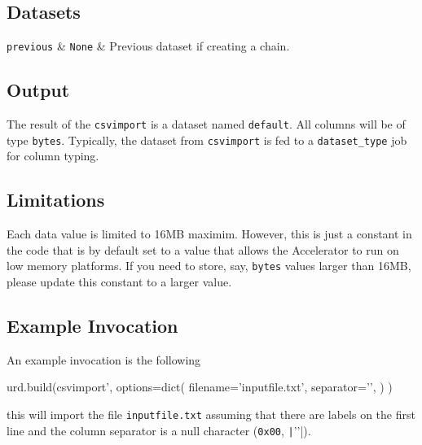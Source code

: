 \subsection{Datasets}

\starttable
  \RP \texttt{previous} & \texttt{None} & Previous dataset if creating a
  chain.\\
\stoptable



\subsection{Output}
The result of the \texttt{csvimport} is a dataset named
\texttt{default}.  All columns will be of type
\texttt{bytes}.  Typically, the dataset from
\texttt{csvimport} is fed to a \texttt{dataset\_type} job for column
typing.


\subsection{Limitations}
Each data value is limited to 16MB maximim.  However, this is just a
constant in the code that is by default set to a value that allows the
Accelerator to run on low memory platforms.  If you need to store,
say, \texttt{bytes} values larger than 16MB, please update this
constant to a larger value.



\subsection{Example Invocation}
An example invocation is the following

\begin{python}
urd.build(csvimport',
    options=dict(
        filename='inputfile.txt',
        separator='\0',
    )
)
\end{python}
this will import the file \texttt{inputfile.txt} assuming that there
are labels on the first line and the column separator is a null
character (\texttt{0x00}, \texttt|'\0'|).







